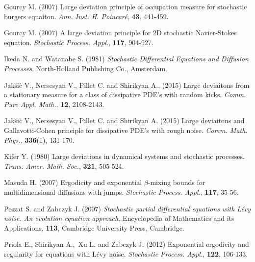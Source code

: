 \documentclass[12pt,a4paper]{article}
\theoremstyle{definition}
\theoremstyle{remark}
\numberwithin{equation}{section}
\begin{document}
{\begin{thebibliography}{99}
 Gourcy M. (2007)  Large deviation principle of occupation measure for stochastic burgers equaiton. {\it Ann. Inst. H. Poincar\'{e}},   \textbf{43},  441-459.


 Gourcy M. (2007)  A large deviation principle for 2D stochastic Navier-Stokes equation. {\it Stochastic Process. Appl.}, \textbf{117}, 904-927.

 Ikeda N. and Watanabe S. (1981) \textit{Stochastic Differential Equations and Diffusion Processes}. North-Holland Publishing Co., Amsterdam.



 Jak\u{s}i\`c V., Nersesyan V., Pillet C.  and Shirikyan A.,  (2015)  Large deviaitons from a stationary measure for a class of dissipative PDE's with random kicks.   {\it Comm. Pure Appl. Math.}, \textbf{12}, 2108-2143.

 Jak\u{s}i\`c V., Nersesyan V., Pillet C.  and Shirikyan A. (2015) Large deviaitons and Gallavotti-Cohen principle for dissipative PDE's with rough noise.  {\it Comm.  Math. Phys.,} \textbf{336}(1), 131-170.

 Kifer Y. (1980) Large deviations in dynamical systems and stochastic processes. {\it Trans. Amer. Math. Soc.}, \textbf{321}, 505-524.



 Masuda H. (2007) Ergodicity and exponential $\beta$-mixing bounds for multidimensional diffusions with jumps. \textit{Stochastic Process. Appl.}, \textbf{117},  35-56.


 Peszat S.  and  Zabczyk J. (2007) \textit{Stochastic partial differential equations with
 {L}\'evy noise. An evolution equation approach.} Encyclopedia of Mathematics and its Applications,  \textbf{113},  Cambridge University Press, Cambridge.


Priola E., Shirikyan A.,~Xu L. and Zabczyk J. (2012) Exponential ergodicity and regularity for equations with L\'evy noise.
 \textit{Stochastic Process. Appl.}, \textbf{122}, 106-133.




\end{thebibliography}}
\end{document}
